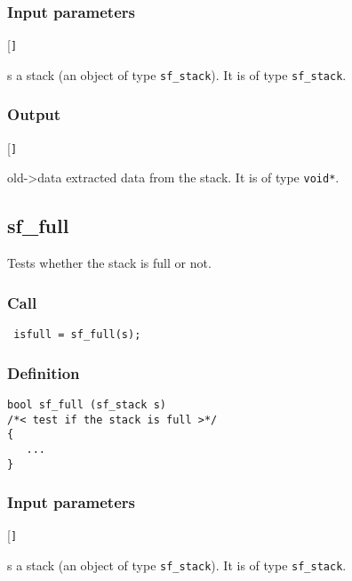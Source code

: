 \subsubsection*{Input parameters}
\begin{desclist}{\tt }{\quad}[\tt ]
   \setlength\itemsep{0pt}
   \item[s] a stack (an object of type \texttt{sf\_stack}). It is of type \texttt{sf\_stack}.
\end{desclist}

\subsubsection*{Output}
\begin{desclist}{\tt }{\quad}[\tt ]
   \setlength\itemsep{0pt}
   \item[old->data] extracted data from the stack. It is of type \texttt{void*}.
\end{desclist}




\subsection{{sf\_full}}
Tests whether the stack is full or not.

\subsubsection*{Call}
\begin{verbatim} isfull = sf_full(s);\end{verbatim}

\subsubsection*{Definition}
\begin{verbatim}
bool sf_full (sf_stack s)
/*< test if the stack is full >*/
{
   ...
}
\end{verbatim}

\subsubsection*{Input parameters}
\begin{desclist}{\tt }{\quad}[\tt ]
   \setlength\itemsep{0pt}
   \item[s] a stack (an object of type \texttt{sf\_stack}). It is of type \texttt{sf\_stack}.
\end{desclist}

